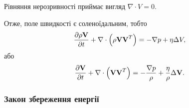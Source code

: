 Рівняння нерозривності приймає вигляд $\nabla \cdot V = 0$. \medskip

Отже, поле швидкості є соленоїдальним, тобто
\begin{equation}
	\frac{\partial \rho \bf{V}}{\partial t} + \nabla \cdot \Big(\rho \bf{V} \bf{V}^T\Big) = - \nabla p + \eta \Delta V,
\end{equation}
або
\begin{equation}
	\frac{\partial \bf{V}}{\partial t} + \nabla \cdot \Big(\bf{V} \bf{V}^T\Big) = - \frac{\nabla p}{\rho} + \frac{\eta}{\rho} \Delta \bf{V}.
\end{equation}

\subsubsection{Закон збереження енергії}

